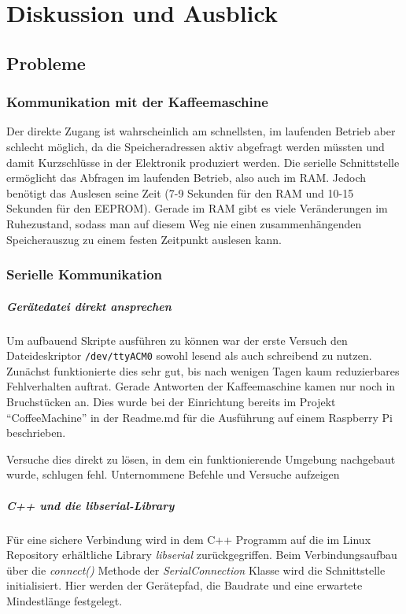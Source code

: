 \chapter{Diskussion und Ausblick}

\section{Probleme}

\subsection{Kommunikation mit der Kaffeemaschine} \label{subsec:zugangSeriellDirekt}
Der direkte Zugang ist wahrscheinlich am schnellsten, im laufenden Betrieb aber schlecht möglich, da die Speicheradressen aktiv abgefragt werden müssten und damit Kurzschlüsse in der Elektronik produziert werden.
Die serielle Schnittstelle ermöglicht das Abfragen im laufenden Betrieb, also auch im \ac{RAM}.
Jedoch benötigt das Auslesen seine Zeit (7-9 Sekunden für den \ac{RAM} und 10-15 Sekunden für den \ac{EEPROM}).
Gerade im \ac{RAM} gibt es viele Veränderungen im Ruhezustand, sodass man auf diesem Weg nie einen zusammenhängenden Speicherauszug zu einem festen Zeitpunkt auslesen kann.

\subsection{Serielle Kommunikation} \label{subsec:kommunikationGeraetedateiLibserialLibrary}
\paragraph{Gerätedatei direkt ansprechen}
Um aufbauend Skripte ausführen zu können war der erste Versuch den Dateideskriptor \texttt{/dev/ttyACM0} sowohl lesend als auch schreibend zu nutzen.
Zunächst funktionierte dies sehr gut, bis nach wenigen Tagen kaum reduzierbares Fehlverhalten auftrat.
Gerade Antworten der Kaffeemaschine kamen nur noch in Bruchstücken an.
Dies wurde bei der Einrichtung bereits im Projekt "`CoffeeMachine"'\cite{GitCoffeeMachine} in der Readme.md für die Ausführung auf einem Raspberry Pi beschrieben.

Versuche dies direkt zu lösen, in dem ein funktionierende Umgebung nachgebaut wurde, schlugen fehl.
\todo Unternommene Befehle und Versuche aufzeigen

\paragraph{C++ und die \textit{libserial}-Library}
Für eine sichere Verbindung wird in dem C++ Programm auf die im Linux Repository erhältliche Library \textit{libserial} zurückgegriffen.
Beim Verbindungsaufbau über die \textit{connect()} Methode der \textit{SerialConnection} Klasse wird die Schnittstelle initialisiert.
Hier werden der Gerätepfad, die Baudrate und eine erwartete Mindestlänge festgelegt.

